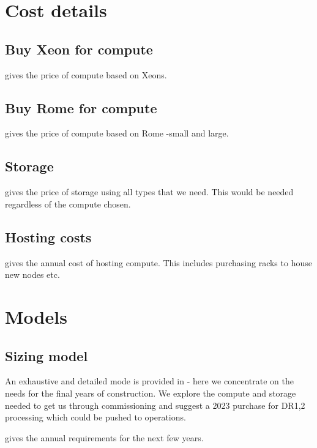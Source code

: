 

\section{Cost details}
\subsection{Buy Xeon for compute} \label{sec:xeon}
 gives the price of compute based on Xeons.


\subsection{Buy Rome for compute} \label{sec:rome}
 gives the price of compute based on Rome -small and large.


\subsection{Storage} \label{sec:storagecost}
 gives the price of storage using all  types that we need.
This would be needed regardless of the compute chosen.


\subsection{Hosting costs} \label{sec:overheads}
 gives the annual cost of hosting compute. This includes purchasing racks to house
new nodes etc.





\section{ Models}\label{sec:model}
\subsection{Sizing model}\label{sec:sizemodel}

An exhaustive and detailed mode is provided in   - here we concentrate on the needs for the
final years of construction. We explore the compute and storage needed to get us through commissioning and suggest a 2023 purchase for DR1,2 processing which could be pushed to operations.

 gives the annual requirements for the next few years.

